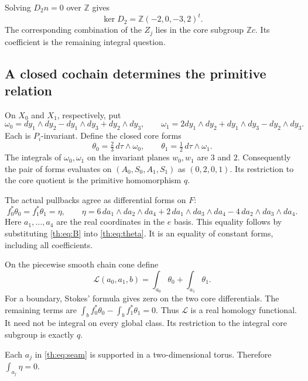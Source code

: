 Solving $D_2n=0$ over $\mathbb Z$ gives
\begin{equation}\label{th:eq:r}
\ker D_2=\mathbb Z(-2,0,-3,2)^t.
\end{equation}
The corresponding combination of the $Z_j$ lies in the core subgroup $\mathbb Zc$.
Its coefficient is the remaining integral question.

\subsection{A closed cochain determines the primitive relation}

On $X_0$ and $X_1$, respectively, put
\[
\omega_0=dy_1\wedge dy_2-dy_1\wedge dy_3+dy_2\wedge dy_3,\qquad
\omega_1=2dy_1\wedge dy_2+dy_1\wedge dy_3-dy_2\wedge dy_3.
\]
Each is $P_i$-invariant.
Define the closed core forms
\begin{equation}\label{th:eq:theta}
\theta_0=\tfrac23\,d\tau\wedge\omega_0,\qquad
\theta_1=\tfrac12\,d\tau\wedge\omega_1.
\end{equation}
The integrals of $\omega_0,\omega_1$ on the invariant planes $w_0,w_1$
are $3$ and $2$.
Consequently the pair of forms evaluates on
$(A_0,S_0,A_1,S_1)$ as $(0,2,0,1)$.
Its restriction to the core quotient is the primitive homomorphism $q$.

The actual pullbacks agree as differential forms on $F$:
\begin{equation}\label{th:eq:eta}
f_0^*\theta_0=f_1^*\theta_1=\eta,\qquad
\eta=6\,da_1\wedge da_2\wedge da_4
 +2\,da_1\wedge da_3\wedge da_4
 -4\,da_2\wedge da_3\wedge da_4.
\end{equation}
Here $a_1,\ldots,a_4$ are the real coordinates in the $e$ basis.
This equality follows by substituting \eqref{th:eq:B} into \eqref{th:eq:theta}.
It is an equality of constant forms, including all coefficients.

On the piecewise smooth chain cone define
\[
\mathcal L(a_0,a_1,b)=\int_{a_0}\theta_0+\int_{a_1}\theta_1.
\]
For a boundary, Stokes' formula gives zero on the two core differentials.
The remaining terms are
$\int_b f_0^*\theta_0-\int_b f_1^*\theta_1=0$.
Thus $\mathcal L$ is a real homology functional.
It need not be integral on every global class.
Its restriction to the integral core subgroup is exactly $q$.

Each $a_j$ in \eqref{th:eq:seam} is supported in a two-dimensional torus.
Therefore $\int_{a_j}\eta=0$.

